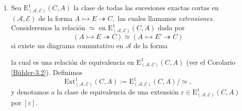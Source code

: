 \documentclass[tesis]{subfiles}
\begin{document}
\begin{Def}
\begin{enumerate}[label=(\alph*)]
        \item Sea $\text{E}_{(\mathscr{A},\mathscr{E})}^1(C,A)$ la clase de todas las sucesiones exactas cortas en $(\mathscr{A},\mathscr{E})$ de la forma $A \rightarrowtail E \twoheadrightarrow C,$
            las cuales llamamos \emph{extensiones}. Consideremos la relación $\simeq$ en $\text{E}_{(\mathscr{A},\mathscr{E})}^1(C,A)$ dada por
            \[
                (A \rightarrowtail E \twoheadrightarrow C) \simeq (A\rightarrowtail E' \twoheadrightarrow C)
            \] 
            si existe un diagrama conmutativo en $\mathscr{A}$ de la forma
            \begin{center}
            \end{center}
            la cual es una relación de equivalencia en $\text{E}^1_{(\mathscr{A},\mathscr{E})}(C,A)$ (ver el Corolario \ref{Bühler-3.2}). Definimos
            \[
                \text{Ext}_{(\mathscr{A},\mathscr{E})}^1(C,A) := \text{E}^1_{(\mathscr{A},\mathscr{E})}(C,A)/\simeq,
            \] 
        y denotamos a la clase de equivalencia de una extensión $\varepsilon\in \text{E}_{(\mathscr{A},\mathscr{E})}^1(C,A)$ por $[\varepsilon]$.


\end{enumerate}
\end{Def}
\end{document}
